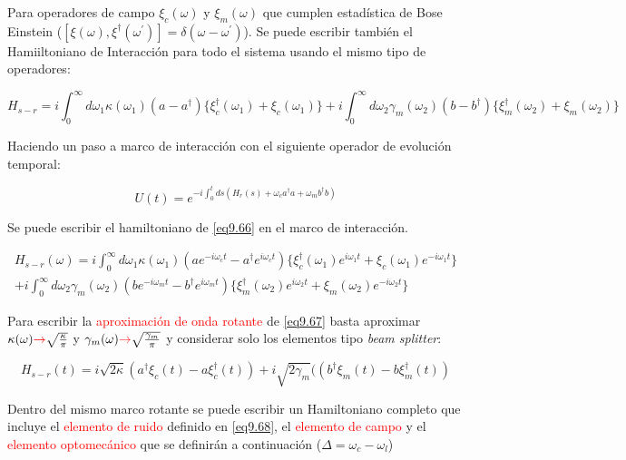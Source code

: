 \documentclass{book}
\begin{document}
Para operadores de campo $\xi_c(\omega)$ y $\xi_m(\omega)$ que cumplen estadística de Bose Einstein ($[\xi(\omega),\xi^\dag(\omega^\prime)]=\delta(\omega-\omega^\prime)$). Se puede escribir también el Hamiiltoniano de Interacción para todo el sistema usando el mismo tipo de operadores: 

\begin{equation}\label{eq9.65}H_{s-r}=i\int_0^\infty d\omega_1\kappa(\omega_1)(a-a^\dag)\{\xi_c^\dag(\omega_1)+\xi_c(\omega_1)\}+i\int_0^\infty d\omega_2\gamma_m(\omega_2)(b-b^\dag)\{\xi_m^\dag(\omega_2)+\xi_m(\omega_2)\}\end{equation}

Haciendo un paso a marco de interacción con el siguiente operador de evolución temporal:

\begin{equation}\label{eq9.66}U(t)=e^{-i\int_0^t ds (H_r(s)+\omega_c a^\dag a+\omega_m b^\dag b)}\end{equation}

Se puede escribir el hamiltoniano de \ref{eq9.66} en el marco de interacción.

\begin{equation}\label{eq9.67}\begin{aligned} H_{s-r}(\omega)=i\int_0^\infty d\omega_1\kappa(\omega_1)(ae^{-i\omega_c t}-a^\dag e^{i\omega_c t})\{\xi_c^\dag(\omega_1)e^{i\omega_1 t}+\xi_c(\omega_1)e^{-i\omega_1 t}\}\\+i\int_0^\infty d\omega_2\gamma_m(\omega_2)(be^{-i\omega_m t}-b^\dag e^{i\omega_m t})\{\xi_m^\dag(\omega_2)e^{i\omega_2 t}+\xi_m(\omega_2)e^{-i\omega_2 t}\}\end{aligned}\end{equation} 

Para escribir la \textcolor{red}{aproximación de onda rotante} de \ref{eq9.67} basta aproximar $\kappa(\omega)\textcolor{red}{\rightarrow}\sqrt{\frac{\kappa}{\pi}}$ y $\gamma_m(\omega)\textcolor{red}{\rightarrow}\sqrt{\frac{\gamma_m}{\pi}}$ y considerar solo los elementos tipo \textit{beam splitter}:

\begin{equation}\label{eq9.68}H_{s-r}(t)=i\sqrt{2\kappa}(a^\dag \xi_c(t)-a\xi_c^\dag(t))+i\sqrt{2\gamma_m}((b^\dag \xi_m(t)-b\xi_m^\dag(t))\end{equation}

Dentro del mismo marco rotante se puede escribir un Hamiltoniano completo que incluye el \textcolor{red}{elemento de ruido} definido en \ref{eq9.68}, el \textcolor{red}{elemento de campo} y el \textcolor{red}{elemento optomecánico} que se definirán a continuación ($\Delta=\omega_c-\omega_l$)
\end{document}
